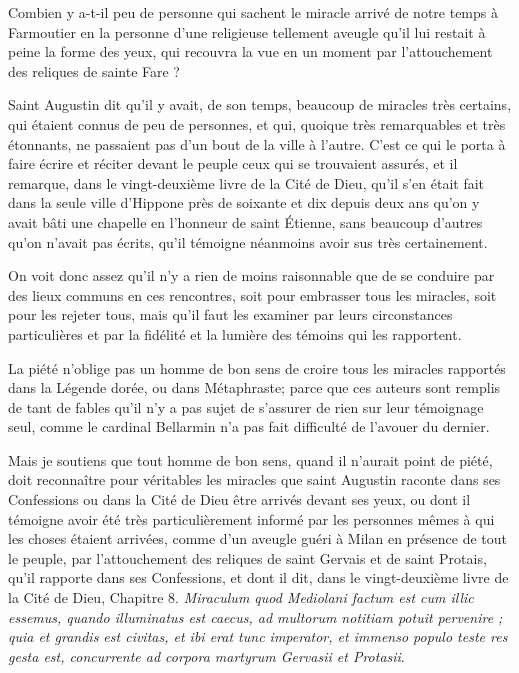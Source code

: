 Combien y a-t-il peu de personne qui sachent le miracle arrivé de notre temps à Farmoutier en la personne d'une religieuse tellement aveugle qu'il lui restait à peine la forme des yeux, qui recouvra la vue en un moment par l'attouchement des reliques de sainte Fare ?

Saint Augustin dit qu'il y avait, de son temps, beaucoup de miracles très certains, qui étaient connus de peu de personnes, et qui, quoique très remarquables et très étonnants, ne passaient pas d'un bout de la ville à l'autre. C'est ce qui le porta à faire écrire et réciter devant le peuple ceux qui se trouvaient assurés, et il remarque, dans le vingt-deuxième livre de la Cité de Dieu, qu'il s'en était fait dans la seule ville d'Hippone près de soixante et dix depuis deux ans qu'on y avait bâti une chapelle en l'honneur de saint Étienne, sans beaucoup d'autres qu'on n'avait pas écrits, qu'il témoigne néanmoins avoir sus très certainement.

On voit donc assez qu'il n'y a rien de moins raisonnable que de se conduire par des lieux communs en ces rencontres, soit pour embrasser tous les miracles, soit pour les rejeter tous, mais qu'il faut les examiner par leurs circonstances particulières et par la fidélité et la lumière des témoins qui les rapportent.

La piété n'oblige pas un homme de bon sens de croire tous les miracles rapportés dans la Légende dorée, ou dans Métaphraste; parce que ces auteurs sont remplis de tant de fables qu'il n'y a pas sujet de s'assurer de rien sur leur témoignage seul, comme le cardinal Bellarmin n'a pas fait difficulté de l'avouer du dernier.

Mais je soutiens que tout homme de bon sens, quand il n'aurait point de piété, doit reconnaître pour véritables les miracles que saint Augustin raconte dans ses Confessions ou dans la Cité de Dieu être arrivés devant ses yeux, ou dont il témoigne avoir été très particulièrement informé par les personnes mêmes à qui les choses étaient arrivées, comme d'un aveugle guéri à Milan en présence de tout le peuple, par l'attouchement des reliques de saint Gervais et de saint Protais, qu'il rapporte dans ses Confessions, et dont il dit, dans le vingt-deuxième livre de la Cité de Dieu, Chapitre 8. \emph{Miraculum quod Mediolani factum est cum illic essemus, quando illuminatus est caecus, ad multorum notitiam potuit pervenire ; quia et grandis est civitas, et ibi erat tunc imperator, et immenso populo teste res gesta est, concurrente ad corpora martyrum Gervasii et Protasii}.

